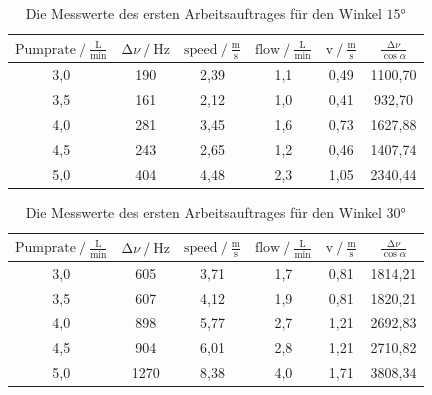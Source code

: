 \begin{table}[H]
    \centering
    \caption{Die Messwerte des ersten Arbeitsauftrages für den Winkel $15\unit{\degree}$} 
    \label{Tabelle3}
    \begin{tabular} {c  c  c  c  c  c} 
        \toprule
        {$ \text{Pumprate} \mathbin{/} \frac{\unit{\liter}}{\unit{\minute}} $} &
        {$ \increment \nu \mathbin{/} \unit{\hertz} $} &
        {$ \text{speed} \mathbin{/} \frac{\unit{\meter}}{\unit{\second}} $} &
        {$ \text{flow} \mathbin{/} \frac{\unit{\liter}}{\unit{\minute}} $}&
        {$ \text{v} \mathbin{/} \frac{\text{m}}{\text{s}} $} &
        {$ \frac{\increment \nu}{\cos \alpha} $} \\
        \midrule
        3,0 & 190 & 2,39 & 1,1 & 0,49 & 1100,70 \\
        3,5 & 161 & 2,12 & 1,0 & 0,41 & 932,70  \\
        4,0 & 281 & 3,45 & 1,6 & 0,73 & 1627,88 \\
        4,5 & 243 & 2,65 & 1,2 & 0,46 & 1407,74 \\
        5,0 & 404 & 4,48 & 2,3 & 1,05 & 2340,44 \\
        \bottomrule
    \end{tabular} 
\end{table}

\begin{table}[H]
    \centering
    \caption{Die Messwerte des ersten Arbeitsauftrages für den Winkel $30\unit{\degree}$} 
    \label{Tabelle4}
    \begin{tabular} {c  c  c  c  c  c}
        \toprule
        {$ \text{Pumprate} \mathbin{/} \frac{\unit{\liter}}{\unit{\minute}} $} &
        {$ \increment \nu \mathbin{/} \unit{\hertz} $} &
        {$ \text{speed} \mathbin{/} \frac{\unit{\meter}}{\unit{\second}} $} &
        {$ \text{flow} \mathbin{/} \frac{\unit{\liter}}{\unit{\minute}} $} &
        {$ \text{v} \mathbin{/} \frac{\text{m}}{\text{s}} $} &
        {$ \frac{\increment \nu}{\cos \alpha} $} \\
        \midrule
        3,0 & 605  & 3,71 & 1,7 & 0,81 & 1814,21 \\
        3,5 & 607  & 4,12 & 1,9 & 0,81 & 1820,21 \\
        4,0 & 898  & 5,77 & 2,7 & 1,21 & 2692,83 \\
        4,5 & 904  & 6,01 & 2,8 & 1,21 & 2710,82 \\
        5,0 & 1270 & 8,38 & 4,0 & 1,71 & 3808,34 \\
        \bottomrule
    \end{tabular} 
\end{table}

